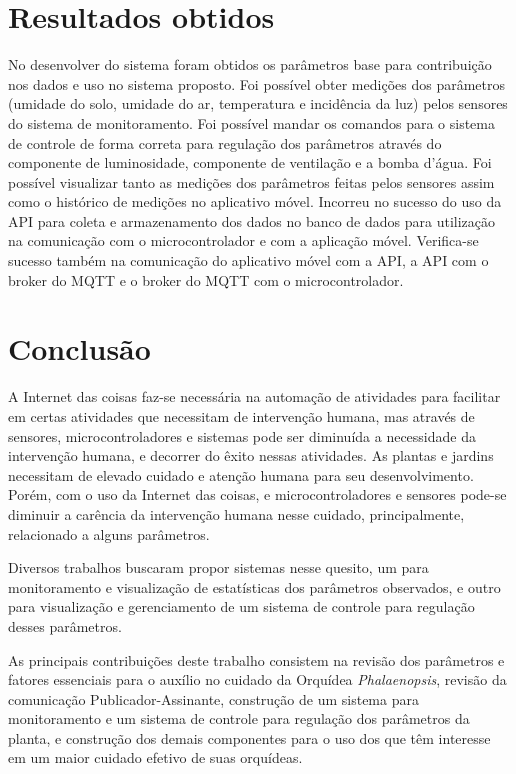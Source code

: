 \documentclass[conference]{IEEEtran}
\begin{document}
\section{Resultados obtidos}
No desenvolver do sistema foram obtidos os parâmetros base para contribuição nos dados e uso no sistema proposto. Foi possível obter medições dos parâmetros (umidade do solo, umidade do ar, temperatura e incidência da luz) pelos sensores do sistema de monitoramento. Foi possível mandar os comandos para o sistema de controle de forma correta para regulação dos parâmetros através do componente de luminosidade, componente de ventilação e a bomba d'água. Foi possível visualizar tanto as medições dos parâmetros feitas pelos sensores assim como o histórico de medições no aplicativo móvel. Incorreu no sucesso do uso da API para coleta e armazenamento dos dados no banco de dados para utilização na comunicação com o microcontrolador e com a aplicação móvel. Verifica-se sucesso também na comunicação do aplicativo móvel com a API, a API com o broker do MQTT e o broker do MQTT com o microcontrolador. 

\section{Conclusão}
A Internet das coisas faz-se necessária na automação de atividades para facilitar em certas atividades que necessitam de intervenção humana, mas através de sensores, microcontroladores e sistemas pode ser diminuída a necessidade da intervenção humana, e decorrer do êxito nessas atividades.
As plantas e jardins necessitam de elevado cuidado e atenção humana para seu desenvolvimento. Porém, com o uso da Internet das coisas, e microcontroladores e sensores pode-se diminuir a carência da intervenção humana nesse cuidado, principalmente, relacionado a alguns parâmetros.

Diversos trabalhos buscaram propor sistemas nesse quesito, um para monitoramento e visualização de estatísticas dos parâmetros observados, e outro para visualização e gerenciamento de um sistema de controle para regulação desses parâmetros.

As principais contribuições deste trabalho consistem na revisão dos parâmetros e fatores essenciais para o auxílio no cuidado da Orquídea {\itshape{Phalaenopsis}}, revisão da comunicação Publicador-Assinante, construção de um sistema para monitoramento e um sistema de controle para regulação dos parâmetros da planta, e construção dos demais componentes para o uso dos que têm interesse em um maior cuidado efetivo de suas orquídeas.
\end{document}
